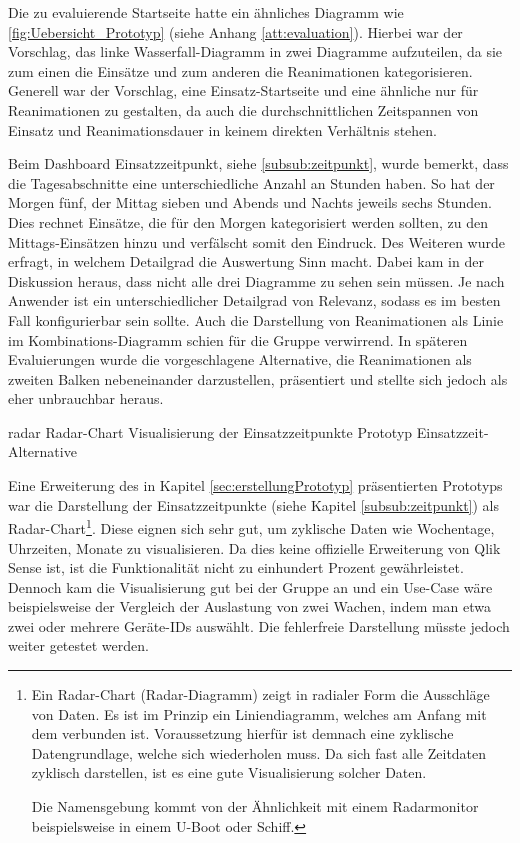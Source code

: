 Die zu evaluierende Startseite hatte ein ähnliches Diagramm wie \ref{fig:Uebersicht_Prototyp} (siehe Anhang \ref{att:evaluation}).
Hierbei war der Vorschlag, das linke Wasserfall-Diagramm in zwei Diagramme aufzuteilen, da sie zum einen die Einsätze und zum anderen die Reanimationen kategorisieren.
Generell war der Vorschlag, eine Einsatz-Startseite und eine ähnliche nur für Reanimationen zu gestalten, da auch die durchschnittlichen Zeitspannen von Einsatz und Reanimationsdauer in keinem direkten Verhältnis stehen.

Beim Dashboard Einsatzzeitpunkt, siehe \ref{subsub:zeitpunkt}, wurde bemerkt, dass die Tagesabschnitte eine unterschiedliche Anzahl an Stunden haben. 
So hat der Morgen fünf, der Mittag sieben und Abends und Nachts jeweils sechs Stunden.
Dies rechnet Einsätze, die für den Morgen kategorisiert werden sollten, zu den Mittags-Einsätzen hinzu und verfälscht somit den Eindruck.
Des Weiteren wurde erfragt, in welchem Detailgrad die Auswertung Sinn macht.
Dabei kam in der Diskussion heraus, dass nicht alle drei Diagramme zu sehen sein müssen. 
Je nach Anwender ist ein unterschiedlicher Detailgrad von Relevanz, sodass es im besten Fall konfigurierbar sein sollte.%
Auch die Darstellung von Reanimationen als Linie im Kombinations-Diagramm schien für die Gruppe verwirrend.
In späteren Evaluierungen wurde die vorgeschlagene Alternative, die Reanimationen als zweiten Balken nebeneinander darzustellen, präsentiert und stellte sich jedoch als eher unbrauchbar heraus.


\bildbreit
{radar}
{Radar-Chart Visualisierung der Einsatzzeitpunkte}
{Prototyp Einsatzzeit-Alternative}

Eine Erweiterung des in Kapitel \ref{sec:erstellungPrototyp} präsentierten Prototyps war die Darstellung der Einsatzzeitpunkte (siehe Kapitel \ref{subsub:zeitpunkt}) als Radar-Chart\footnote{Ein Radar-Chart (Radar-Diagramm) zeigt in radialer Form die Ausschläge von Daten.
Es ist im Prinzip ein Liniendiagramm, welches am Anfang mit dem verbunden ist.
Voraussetzung hierfür ist demnach eine zyklische Datengrundlage, welche sich wiederholen muss.
Da sich fast alle Zeitdaten zyklisch darstellen, ist es eine gute Visualisierung solcher Daten.

Die Namensgebung kommt von der Ähnlichkeit mit einem Radarmonitor beispielsweise in einem U-Boot oder  Schiff.}.
Diese eignen sich sehr gut, um zyklische Daten wie Wochentage, Uhrzeiten, Monate zu visualisieren.
Da dies keine offizielle Erweiterung von Qlik Sense ist, ist die Funktionalität nicht zu einhundert Prozent gewährleistet.
Dennoch kam die Visualisierung gut bei der Gruppe an und ein Use-Case wäre beispielsweise der Vergleich der Auslastung von zwei Wachen, indem man etwa zwei oder mehrere Geräte-IDs auswählt.
Die fehlerfreie Darstellung müsste jedoch weiter getestet werden.

